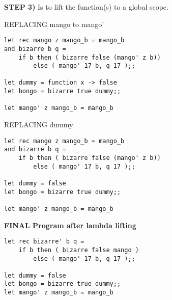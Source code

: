 \noindent \textbf{STEP 3)} Is to lift the function(s) to a global scope.

REPLACING mango to mango'
\begin{verbatim}
let rec mango z mango_b = mango_b
and bizarre b q =
    if b then ( bizarre false (mango' z b))
        else ( mango' 17 b, q 17 );;

let dummy = function x -> false
let bongo = bizarre true dummy;;

let mango' z mango_b = mango_b
\end{verbatim}


REPLACING dummy 
\begin{verbatim}
let rec mango z mango_b = mango_b
and bizarre b q =
    if b then ( bizarre false (mango' z b))
        else ( mango' 17 b, q 17 );;

let dummy = false
let bongo = bizarre true dummy;;

let mango' z mango_b = mango_b
\end{verbatim}

\newpage
\noindent \textbf{FINAL Program after lambda lifting}
\begin{verbatim}
let rec bizarre' b q =
    if b then ( bizarre false mango )
        else ( mango' 17 b, q 17 );;

let dummy = false
let bongo = bizarre true dummy;;
let mango' z mango_b = mango_b
\end{verbatim}

\newpage